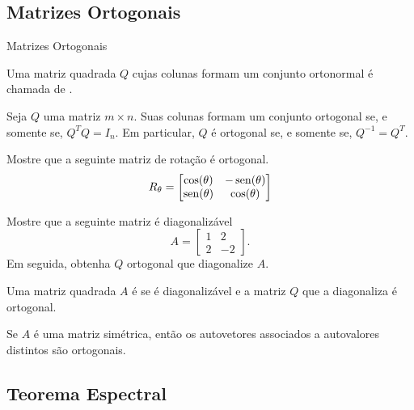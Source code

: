 \subsection*{Matrizes Ortogonais}
\begin{frame}[label=orto]{Matrizes Ortogonais}

\begin{defin}
Uma matriz quadrada $Q$ cujas colunas formam um conjunto ortonormal é chamada 
de .
\end{defin}

\begin{teo}
Seja $Q$ uma matriz $m\times n$. Suas colunas formam um conjunto ortogonal se, 
e somente se, $Q^TQ=I_n$. Em particular, $Q$ é ortogonal se, e somente se, $Q^{-1}=Q^T$.
\end{teo}

\begin{exe}
Mostre que  a seguinte matriz de rotação é ortogonal.
\[R_\theta= 
\begin{bmatrix}
\cos(\theta) & -\operatorname{sen}(\theta)\\
\operatorname{sen}(\theta) & \cos(\theta)
\end{bmatrix}
\]
\end{exe}

\end{frame}


\begin{frame}[label=orto]{}

\begin{exe}
Mostre que  a seguinte matriz é diagonalizável
\[A=
\begin{bmatrix}
1& 2\\ 2 & -2
\end{bmatrix}.
\]
Em seguida, obtenha $Q$ ortogonal que diagonalize $A$.
\end{exe}

\begin{defin}
Uma matriz quadrada $A$ é  se é 
diagonalizável e a matriz $Q$ que a diagonaliza é ortogonal.
\end{defin}

\begin{prop}
Se $A$ é uma matriz simétrica, então os autovetores associados a autovalores distintos são ortogonais.
\end{prop}

\end{frame}

\subsection*{Teorema Espectral}

